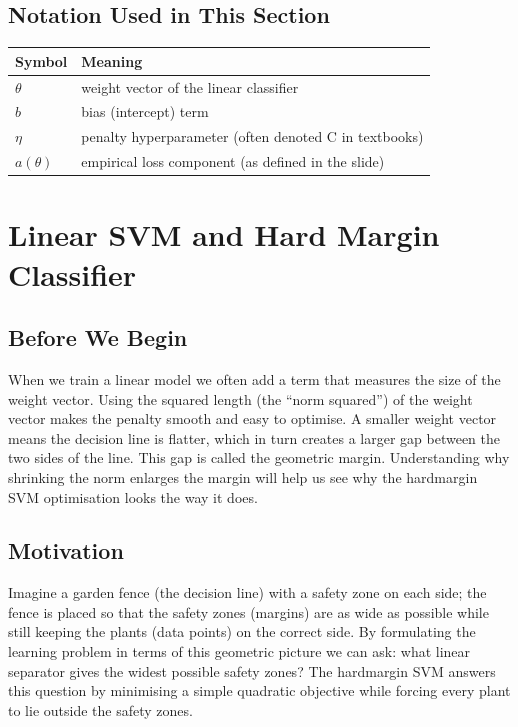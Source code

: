 \documentclass[12pt, a4paper]{article}
\begin{document}
\subsection*{Notation Used in This Section}
\begin{tabular}{@{}ll@{}}
\toprule
Symbol & Meaning \\ \midrule
    $\theta$ & weight vector of the linear classifier \\
    $b$ & bias (intercept) term \\
    $\eta$ & penalty hyperparameter (often denoted C in textbooks) \\
    $a(\theta)$ & empirical loss component (as defined in the slide) \\
\bottomrule
\end{tabular}
\vspace{1em}

\section{Linear SVM and Hard Margin Classifier}

\subsection{Before We Begin}
When we train a linear model we often add a term that measures the size of the weight vector.  Using the squared length (the ``norm squared'') of the weight vector makes the penalty smooth and easy to optimise.  A smaller weight vector means the decision line is flatter, which in turn creates a larger gap between the two sides of the line.  This gap is called the geometric margin.  Understanding why shrinking the norm enlarges the margin will help us see why the hardmargin SVM optimisation looks the way it does.  

\subsection{Motivation}
Imagine a garden fence (the decision line) with a safety zone on each side; the fence is placed so that the safety zones (margins) are as wide as possible while still keeping the plants (data points) on the correct side.  By formulating the learning problem in terms of this geometric picture we can ask: what linear separator gives the widest possible safety zones?  The hardmargin SVM answers this question by minimising a simple quadratic objective while forcing every plant to lie outside the safety zones.  
\end{document}
